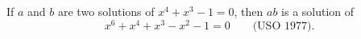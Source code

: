 If $a$ and $b$ are two solutions of $x^4 + x^3 - 1 = 0$, then $ab$ is a solution of
\[ x^6 + x^4 + x^3 - x^2 - 1 = 0 \qquad \text{(USO 1977).} \]
